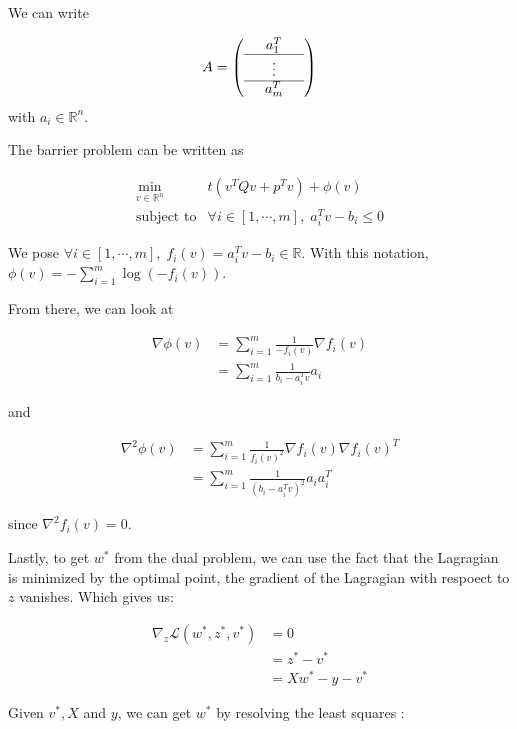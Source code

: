 \documentclass[11pt]{article}
\begin{document}
    We can write

\[
A = \left(\begin{array}{ccc}
& a_1^T & \\
\hline
& \vdots & \\
\hline
& a_m^T &
\end{array}\right)
\] with \(a_i \in \mathbb{R}^n\).

The barrier problem can be written as

\begin{equation}
\tag{Barrier}

\begin{array}{ll}
\displaystyle \min_{v \in \mathbb{R}^n} & t (v^T Q v + p^T v) + \phi(v) \\
\text{subject to} & \forall i \in [1, \cdots, m], \; a_i^T v - b_i \le 0
\end{array}

\end{equation}

We pose
\(\forall i \in [1, \cdots, m], \; f_i(v) = a_i^T v - b_i \in \mathbb{R}\).
With this notation,
\(\phi(v) = - \displaystyle \sum_{i=1}^m \log(-f_i(v))\).

From there, we can look at

\begin{align*}
\nabla \phi(v) &= \sum_{i=1}^m \frac{1}{- f_i(v)} \nabla f_i(v) \\
&= \sum_{i=1}^m \frac{1}{b_i - a_i^T v} a_i
\end{align*}

and

\begin{align*}
\nabla^2 \phi(v) &= \sum_{i=1}^m \frac{1}{f_i(v)^2} \nabla f_i(v) \nabla f_i(v)^T \\
&= \sum_{i=1}^m \frac{1}{(b_i - a_i^T v)^2} a_i a_i^T
\end{align*}

since \(\nabla^2 f_i(v) = 0\).

Lastly, to get \(w^*\) from the dual problem, we can use the fact that
the Lagragian is minimized by the optimal point, the gradient of the
Lagragian with respoect to \(z\) vanishes. Which gives us:

\begin{align*}
    \nabla_z \mathcal{L}(w^*, z^*, v^*) &= 0 \\
    &= z^* - v^* \\
    &= X w^* - y - v^*
\end{align*}

Given \(v^*, X\) and \(y\), we can get \(w^*\) by resolving the least
squares :
\end{document}
